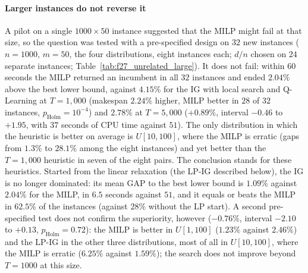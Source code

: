 \documentclass[final,3p,times,11pt,authoryear]{elsarticle}
\begin{document}
\paragraph{Larger instances do not reverse it}
A pilot on a single $1000\times50$ instance suggested that the MILP might fail at
that size, so the question was tested with a pre-specified design on $32$ new
instances ($n=1000$, $m=50$, the four distributions, eight instances each; $d/n$
chosen on $24$ separate instances; Table~\ref{tab:f27_unrelated_large}). It does
not fail: within 60 seconds the MILP returned an incumbent in all $32$ instances
and ended $2.04\%$ above the best lower bound, against $4.15\%$ for the IG with
local search and Q-Learning at $T=1{,}000$ (makespan $2.24\%$ higher, MILP better in
$28$ of $32$ instances, $p_{\mathrm{Holm}}=10^{-4}$) and $2.78\%$ at $T=5{,}000$
($+0.89\%$, interval $-0.46$ to $+1.95$, with $37$ seconds of CPU time against $51$).
The only distribution in which the heuristic is better on average is $U[10,100]$,
where the MILP is erratic (gaps from $1.3\%$ to $28.1\%$ among the eight instances)
and yet better than the $T=1{,}000$ heuristic in seven of the eight pairs. The
conclusion stands for these heuristics. Started from the linear relaxation (the LP-IG described below), the IG is no longer dominated: its mean GAP to the best lower bound is $1.09\%$ against $2.04\%$ for the MILP, in $6.5$ seconds against $51$, and it equals or beats the MILP in $62.5\%$ of the instances (against $28\%$ without the LP start). A second pre-specified test does not confirm the superiority, however ($-0.76\%$, interval $-2.10$ to $+0.13$, $p_{\mathrm{Holm}}=0.72$): the MILP is better in $U[1,100]$ ($1.23\%$ against $2.46\%$) and the LP-IG in the other three distributions, most of all in $U[10,100]$, where the MILP is erratic ($6.25\%$ against $1.59\%$); the search does not improve beyond $T=1000$ at this size.


\end{document}
